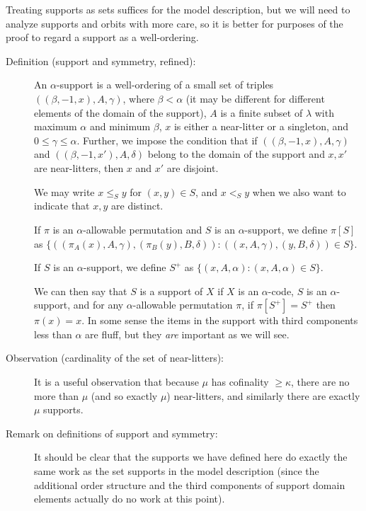 Treating supports as sets suffices for the model description, but we will need to analyze supports and orbits with more care, so it is better for purposes
of the proof to regard a support as a well-ordering.

\begin{description}

\item[Definition (support and symmetry, refined):]  An $\alpha$-support is a well-ordering of a small set of triples $((\beta,-1,x),A,\gamma)$, where $\beta<\alpha$ (it may be different for different elements of the domain of the support), $A$ is a finite subset of $\lambda$ with maximum $\alpha$ and minimum $\beta$, $x$ is either a near-litter or a singleton, and $0 \leq \gamma \leq\alpha$.  Further, we impose the condition that if $((\beta,-1,x),A,\gamma)$ and $((\beta,-1,x'),A,\delta)$ belong to the domain of the support and $x,x'$ are near-litters, then $x$ and $x'$ are disjoint.

We may write $x \leq_S y$ for $(x,y) \in S$, and $x <_S y$ when we also want to indicate that $x,y$ are distinct.

If $\pi$ is an $\alpha$-allowable permutation and $S$ is an $\alpha$-support, we define $\pi[S]$ as $\{((\pi_A(x),A,\gamma),(\pi_B(y),B,\delta)):((x,A,\gamma),(y,B,\delta))\in S\}$.

If $S$ is an $\alpha$-support, we define $S^+$ as $\{(x,A,\alpha):(x,A,\alpha) \in S\}$.

We can then say that $S$ is a support of $X$ if $X$ is an $\alpha$-code, $S$ is an $\alpha$-support, and for any $\alpha$-allowable permutation $\pi$, if $\pi[S^+]=S^+$ then $\pi(x)=x$.  In some sense the items in the support with third components less than $\alpha$ are fluff, but they {\em are\/} important as we will see.

\item[Observation (cardinality of the set of near-litters):]  It is a useful observation that because $\mu$ has cofinality $\geq \kappa$, there are no more than $\mu$ (and so exactly $\mu$) near-litters,
and similarly there are exactly $\mu$ supports.

\item[Remark on definitions of support and symmetry:]  It should be clear that the supports we have defined here do exactly the same work as the set supports in the model description (since the additional order structure and the third components of support domain elements actually do no work at this point).


\end{description}

